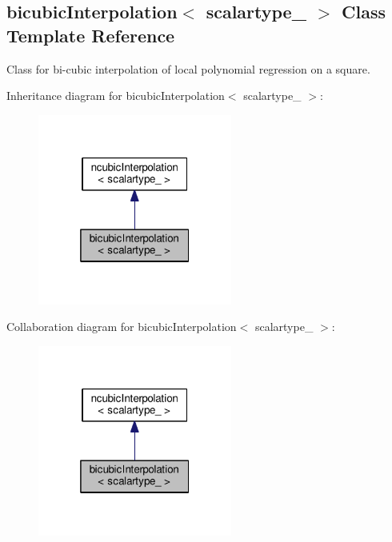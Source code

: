 \hypertarget{classbicubicInterpolation}{}\subsection{bicubic\+Interpolation$<$ scalartype\+\_\+ $>$ Class Template Reference}
\label{classbicubicInterpolation}


Class for bi-\/cubic interpolation of local polynomial regression on a square.  




Inheritance diagram for bicubic\+Interpolation$<$ scalartype\+\_\+ $>$\+:\nopagebreak
\begin{figure}[H]
\begin{center}
\leavevmode
\includegraphics[width=181pt]{classbicubicInterpolation__inherit__graph}
\end{center}
\end{figure}


Collaboration diagram for bicubic\+Interpolation$<$ scalartype\+\_\+ $>$\+:\nopagebreak
\begin{figure}[H]
\begin{center}
\leavevmode
\includegraphics[width=181pt]{classbicubicInterpolation__coll__graph}
\end{center}
\end{figure}
